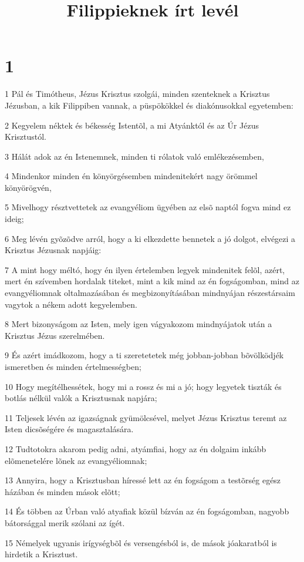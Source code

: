 

\title{Filippieknek írt levél}


\chapter{1}

\par 1 Pál és Timótheus, Jézus Krisztus szolgái, minden szenteknek a Krisztus Jézusban, a kik Filippiben vannak, a püspökökkel és diakónusokkal egyetemben:
\par 2 Kegyelem néktek és békesség Istentõl, a mi Atyánktól és az Úr Jézus Krisztustól.
\par 3 Hálát adok az én Istenemnek, minden ti rólatok való emlékezésemben,
\par 4 Mindenkor minden én könyörgésemben mindenitekért nagy örömmel könyörögvén,
\par 5 Mivelhogy résztvettetek az evangyéliom ügyében az elsõ naptól fogva mind ez ideig;
\par 6 Meg lévén gyõzõdve arról, hogy a ki elkezdette bennetek a jó dolgot, elvégezi a Krisztus Jézusnak napjáig:
\par 7 A mint hogy méltó, hogy én ilyen értelemben legyek mindenitek felõl, azért, mert én szívemben hordalak titeket, mint a kik mind az én fogságomban, mind az evangyéliomnak oltalmazásában és megbizonyításában mindnyájan részestársaim vagytok a nékem adott kegyelemben.
\par 8 Mert bizonyságom az Isten, mely igen vágyakozom mindnyájatok után a Krisztus Jézus szerelmében.
\par 9 És azért imádkozom, hogy a ti szeretetetek még jobban-jobban bõvölködjék ismeretben és minden értelmességben;
\par 10 Hogy megítélhessétek, hogy mi a rossz és mi a jó; hogy legyetek tiszták és botlás nélkül valók a Krisztusnak napjára;
\par 11 Teljesek lévén az igazságnak gyümölcsével, melyet Jézus Krisztus teremt az Isten dicsõségére és magasztalására.
\par 12 Tudtotokra akarom pedig adni, atyámfiai, hogy az én dolgaim inkább elõmenetelére lõnek az evangyéliomnak;
\par 13 Annyira, hogy a Krisztusban híressé lett az én fogságom a testõrség egész házában és minden mások elõtt;
\par 14 És többen az Úrban való atyafiak közül bízván az én fogságomban, nagyobb bátorsággal merik szólani az ígét.
\par 15 Némelyek ugyanis irígységbõl és versengésból is, de mások jóakaratból is hirdetik a Krisztust.
